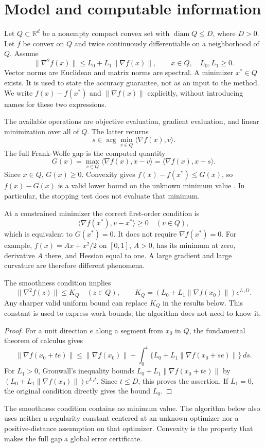 \section{Model and computable information}
\label{sec:model}
Let $Q\subset\mathbb R^d$ be a nonempty compact convex set with
$\operatorname{diam}Q\le D$, where $D>0$. Let $f$ be convex on $Q$
and twice continuously differentiable on a neighborhood of $Q$. Assume
\begin{equation}\label{eq:gradient_smoothness}
 \|\nabla^2f(x)\|\le L_0+L_1\|\nabla f(x)\|,\qquad x\in Q,
 \quad L_0,L_1\ge0.
\end{equation}
Vector norms are Euclidean and matrix norms are spectral. A minimizer
$x^*\in Q$ exists. It is used to state the accuracy guarantee, not as an
input to the method. We write $f(x)-f(x^*)$ and $\|\nabla f(x)\|$
explicitly, without introducing names for these two expressions.

The available operations are objective evaluation, gradient evaluation,
and linear minimization over all of $Q$. The latter returns
\[
 s\in\arg\min_{v\in Q}\langle\nabla f(x),v\rangle.
\]
The full Frank-Wolfe gap is the computed quantity
\begin{equation}\label{eq:gap}
 G(x)=\max_{v\in Q}\langle\nabla f(x),x-v\rangle
     =\langle\nabla f(x),x-s\rangle.
\end{equation}
Since $x\in Q$, $G(x)\ge0$. Convexity gives
$f(x)-f(x^*)\le G(x)$, so $f(x)-G(x)$ is a valid lower bound on the
unknown minimum value \cite{jaggi}. In particular, the stopping test
does not evaluate that minimum.

At a constrained minimizer the correct first-order condition is
\[
 \langle\nabla f(x^*),v-x^*\rangle\ge0\quad(v\in Q),
\]
which is equivalent to $G(x^*)=0$. It does not require
$\nabla f(x^*)=0$. For example, $f(x)=Ax+x^2/2$ on $[0,1]$, $A>0$,
has its minimum at zero, derivative $A$ there, and Hessian equal to one.
A large gradient and large curvature are therefore different phenomena.

\begin{lemma}
\label{lem:global_curvature}
The smoothness condition implies
\begin{equation}\label{eq:global_curvature}
 \|\nabla^2f(z)\|\le K_Q\quad(z\in Q),\qquad
 K_Q=(L_0+L_1\|\nabla f(x_0)\|)e^{L_1D}.
\end{equation}
Any sharper valid uniform bound can replace $K_Q$ in the results below.
This constant is used to express work bounds; the algorithm does not
need to know it.
\end{lemma}
\begin{proof}
For a unit direction $e$ along a segment from $x_0$ in $Q$, the
fundamental theorem of calculus gives
\[
 \|\nabla f(x_0+te)\|\le\|\nabla f(x_0)\|
 +\int_0^t\{L_0+L_1\|\nabla f(x_0+se)\|\}\,ds.
\]
For $L_1>0$, Gronwall's inequality bounds
$L_0+L_1\|\nabla f(x_0+te)\|$ by
$(L_0+L_1\|\nabla f(x_0)\|)e^{L_1t}$. Since $t\le D$, this proves
the assertion. If $L_1=0$, the original condition directly gives the
bound $L_0$.
\end{proof}

The smoothness condition contains no minimum value. The algorithm below
also uses neither a regularity constant centered at an unknown optimizer
nor a positive-distance assumption on that optimizer. Convexity is the
property that makes the full gap a global error certificate.
